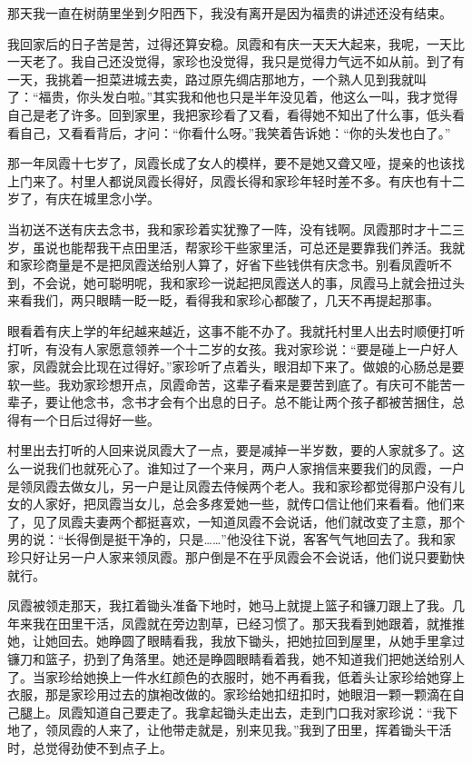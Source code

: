 \documentclass[12pt,UTF8]{ctexbook}
\begin{document}
那天我一直在树荫里坐到夕阳西下，我没有离开是因为福贵的讲述还没有结束。

我回家后的日子苦是苦，过得还算安稳。凤霞和有庆一天天大起来，我呢，一天比一天老了。我自己还没觉得，家珍也没觉得，我只是觉得力气远不如从前。到了有一天，我挑着一担菜进城去卖，路过原先绸店那地方，一个熟人见到我就叫了：“福贵，你头发白啦。”其实我和他也只是半年没见着，他这么一叫，我才觉得自己是老了许多。回到家里，我把家珍看了又看，看得她不知出了什么事，低头看看自己，又看看背后，才问：“你看什么呀。”我笑着告诉她：“你的头发也白了。”


那一年凤霞十七岁了，凤霞长成了女人的模样，要不是她又聋又哑，提亲的也该找上门来了。村里人都说凤霞长得好，凤霞长得和家珍年轻时差不多。有庆也有十二岁了，有庆在城里念小学。

当初送不送有庆去念书，我和家珍着实犹豫了一阵，没有钱啊。凤霞那时才十二三岁，虽说也能帮我干点田里活，帮家珍干些家里活，可总还是要靠我们养活。我就和家珍商量是不是把凤霞送给别人算了，好省下些钱供有庆念书。别看凤霞听不到，不会说，她可聪明呢，我和家珍一说起把凤霞送人的事，凤霞马上就会扭过头来看我们，两只眼睛一眨一眨，看得我和家珍心都酸了，几天不再提起那事。

眼看着有庆上学的年纪越来越近，这事不能不办了。我就托村里人出去时顺便打听打听，有没有人家愿意领养一个十二岁的女孩。我对家珍说：“要是碰上一户好人家，凤霞就会比现在过得好。”家珍听了点着头，眼泪却下来了。做娘的心肠总是要软一些。我劝家珍想开点，凤霞命苦，这辈子看来是要苦到底了。有庆可不能苦一辈子，要让他念书，念书才会有个出息的日子。总不能让两个孩子都被苦捆住，总得有一个日后过得好一些。

村里出去打听的人回来说凤霞大了一点，要是减掉一半岁数，要的人家就多了。这么一说我们也就死心了。谁知过了一个来月，两户人家捎信来要我们的凤霞，一户是领凤霞去做女儿，另一户是让凤霞去侍候两个老人。我和家珍都觉得那户没有儿女的人家好，把凤霞当女儿，总会多疼爱她一些，就传口信让他们来看看。他们来了，见了凤霞夫妻两个都挺喜欢，一知道凤霞不会说话，他们就改变了主意，那个男的说：“长得倒是挺干净的，只是……”他没往下说，客客气气地回去了。我和家珍只好让另一户人家来领凤霞。那户倒是不在乎凤霞会不会说话，他们说只要勤快就行。

凤霞被领走那天，我扛着锄头准备下地时，她马上就提上篮子和镰刀跟上了我。几年来我在田里干活，凤霞就在旁边割草，已经习惯了。那天我看到她跟着，就推推她，让她回去。她睁圆了眼睛看我，我放下锄头，把她拉回到屋里，从她手里拿过镰刀和篮子，扔到了角落里。她还是睁圆眼睛看着我，她不知道我们把她送给别人了。当家珍给她换上一件水红颜色的衣服时，她不再看我，低着头让家珍给她穿上衣服，那是家珍用过去的旗袍改做的。家珍给她扣纽扣时，她眼泪一颗一颗滴在自己腿上。凤霞知道自己要走了。我拿起锄头走出去，走到门口我对家珍说：“我下地了，领凤霞的人来了，让他带走就是，别来见我。”我到了田里，挥着锄头干活时，总觉得劲使不到点子上。
\end{document}
